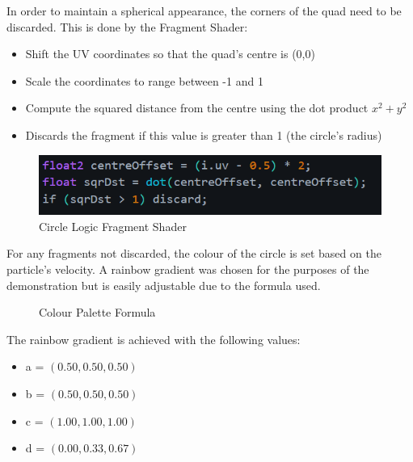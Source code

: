\documentclass[12pt]{article}
\newcommand{\wideimage}[2][]{%
  \makebox[\textwidth][c]{\texttt{[image: \#2]}}%
}
\begin{document}
    In order to maintain a spherical appearance, the corners of the quad need to be discarded. This is done by the Fragment Shader:
    
    \begin{itemize}
        \item Shift the UV coordinates so that the quad's centre is (0,0)
        \item Scale the coordinates to range between -1 and 1
        \item Compute the squared distance from the centre using the dot product $x^2 + y^2$
        \item Discards the fragment if this value is greater than 1 (the circle's radius)
    \end{itemize}

    \begin{figure}[H]
        \begin{center}
            \includegraphics[]{circleLogic.png}
            \caption{Circle Logic Fragment Shader \cite{lague2}}
        \end{center}
    \end{figure}

    For any fragments not discarded, the colour of the circle is set based on the particle's velocity. A rainbow gradient was chosen for the purposes of the demonstration but is easily adjustable due to the formula used\cite{colours}.

    \begin{figure}[H]
        \begin{center}
            \wideimage[]{paletteHelper.png}
            \caption{Colour Palette Formula \cite{colours}}
        \end{center}
    \end{figure}

    The rainbow gradient is achieved with the following values:
    \begin{itemize}
        \item a = $(0.50, 0.50, 0.50)$
        \item b = $(0.50, 0.50, 0.50)$
        \item c = $(1.00, 1.00, 1.00)$
        \item d = $(0.00, 0.33, 0.67)$
    \end{itemize}
\end{document}
